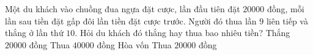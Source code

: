 \begin{ex}%
	Một du khách vào chuồng đua ngựa đặt cược, lần đầu tiên đặt $20000$ đồng, mỗi lần sau tiền đặt gấp đôi lần tiền đặt cược trước. Người đó thua lần $9$ liên tiếp và thắng ở lần thứ $10$. Hỏi du khách đó thắng hay thua bao nhiêu tiền?
	\choice
	{\True Thắng $20000$ đồng}
	{Thua $40000$ đồng}
	{Hòa vốn}
	{Thua $20000$ đồng}
\end{ex}


